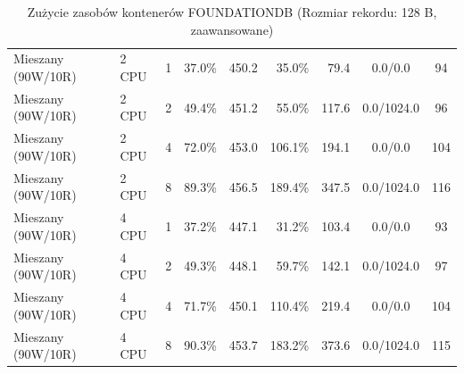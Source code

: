 \begin{table}[ht]
{\begin{tabular}{llcrrrrcc}
Mieszany (90W/10R) & 2 CPU & 1 & 37.0\% & 450.2 & 35.0\% & 79.4 & 0.0/0.0 & 94 \\
Mieszany (90W/10R) & 2 CPU & 2 & 49.4\% & 451.2 & 55.0\% & 117.6 & 0.0/1024.0 & 96 \\
Mieszany (90W/10R) & 2 CPU & 4 & 72.0\% & 453.0 & 106.1\% & 194.1 & 0.0/0.0 & 104 \\
Mieszany (90W/10R) & 2 CPU & 8 & 89.3\% & 456.5 & 189.4\% & 347.5 & 0.0/1024.0 & 116 \\
Mieszany (90W/10R) & 4 CPU & 1 & 37.2\% & 447.1 & 31.2\% & 103.4 & 0.0/0.0 & 93 \\
Mieszany (90W/10R) & 4 CPU & 2 & 49.3\% & 448.1 & 59.7\% & 142.1 & 0.0/1024.0 & 97 \\
Mieszany (90W/10R) & 4 CPU & 4 & 71.7\% & 450.1 & 110.4\% & 219.4 & 0.0/0.0 & 104 \\
Mieszany (90W/10R) & 4 CPU & 8 & 90.3\% & 453.7 & 183.2\% & 373.6 & 0.0/1024.0 & 115 \\
\bottomrule
\end{tabular}%
}
\caption{Zużycie zasobów kontenerów FOUNDATIONDB (Rozmiar rekordu: 128 B, zaawansowane)}
\label{tab:resources_foundationdb_small_0}
\end{table}
